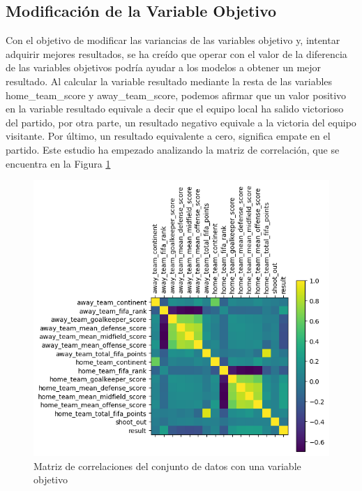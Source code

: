 \subsection{Modificación de la Variable Objetivo}

Con el objetivo de modificar las variancias de las variables objetivo y, intentar adquirir mejores resultados, se ha creído que operar con el valor de la diferencia de las variables objetivos podría ayudar a los modelos a obtener un mejor resultado. Al calcular la variable resultado mediante la resta de las variables home\_team\_score y away\_team\_score, podemos afirmar que un valor positivo en la variable resultado equivale a decir que el equipo local ha salido victorioso del partido, por otra parte, un resultado negativo equivale a la victoria del equipo visitante. Por último, un resultado equivalente a cero, significa empate en el partido. Este estudio ha empezado analizando la matriz de correlación, que se encuentra en la Figura \ref{Conjunto-Datos-Matriz-Correlaciones-Una-Variable}

\begin{figure}[H]
\centering
\includegraphics[width=\figsize]{images/correlationMatrixOneObjectiveVariable.png}
\caption{Matriz de correlaciones del conjunto de datos con una variable objetivo}
\label{Conjunto-Datos-Matriz-Correlaciones-Una-Variable}
\end{figure}

